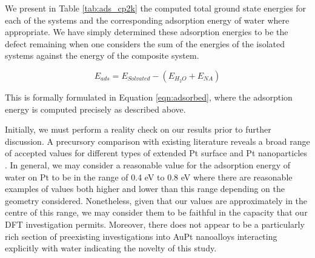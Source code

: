 We present in Table \ref{tab:ads_cp2k} the computed total ground state energies for each of the systems and the corresponding adsorption energy of water where appropriate. We have simply determined these adsorption energies to be the defect remaining when one considers the sum of the energies of the isolated systems against the energy of the composite system.

\begin{equation}
    E_{ads} = E_{Solvated} - \left( E_{H_{2}O} + E_{NA} \right)
    \label{eqn:adsorbed}
\end{equation}

This is formally formulated in Equation \ref{eqn:adsorbed}, where the adsorption energy is computed precisely as described above. 

Initially, we must perform a reality check on our results prior to further discussion. A precursory comparison with existing literature reveals a broad range of accepted values for different types of extended Pt surface \cite{C8RA00952J,doi:10.1021/jp201608x,C8SC02495B} and Pt nanoparticles \cite{doi:10.1021/acs.jpcc.9b06136}. In general, we may consider a reasonable value for the adsorption energy of water on Pt to be in the range of 0.4 eV to 0.8 eV where there are reasonable examples of values both higher and lower than this range depending on the geometry considered. Nonetheless, given that our values are approximately in the centre of this range, we may consider them to be faithful in the capacity that our DFT investigation permits. Moreover, there does not appear to be a particularly rich section of preexisting investigations into AuPt nanoalloys interacting explicitly with water indicating the novelty of this study.

